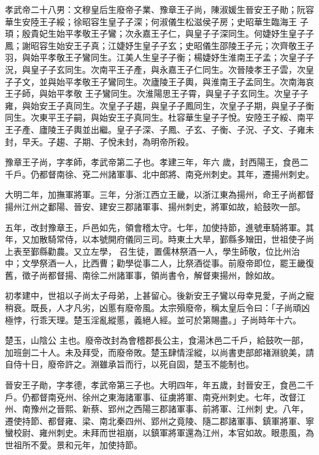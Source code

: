 
\begin{pinyinscope}

 孝武帝二十八男：文穆皇后生廢帝子業、豫章王子尚，陳淑媛生晉安王子勛；阮容華生安陸王子綏；徐昭容生皇子子深；何淑儀生松滋侯子房；史昭華生臨海王
 子頊；殷貴妃生始平孝敬王子鸞；次永嘉王子仁，與皇子子深同生。何婕妤生皇子子鳳；謝昭容生始安王子真；江婕妤生皇子子玄；史昭儀生邵陵王子元；次齊敬王子羽，與始平孝敬王子鸞同生。江美人生皇子子衡；楊婕妤生淮南王子孟；次皇子子況，與皇子子玄同生。次南平王子產，與永嘉王子仁同生。次晉陵孝王子雲，次皇子子文，並與始平孝敬王子鸞同生。次廬陵王子輿，與淮南王子孟同生。次南海哀王子師，與始平孝敬
 王子鸞同生。次淮陽思王子霄，與皇子子玄同生。次皇子子雍，與始安王子真同生。次皇子子趨，與皇子子鳳同生，次皇子子期，與皇子子衡同生。次東平王子嗣，與始安王子真同生。杜容華生皇子子悅。安陸王子綏、南平王子產、廬陵王子輿並出繼。皇子子深、子鳳、子玄、子衡、子況、子文、子雍未封，早夭。子趨、子期、子悅未封，為明帝所殺。



 豫章王子尚，字孝師，孝武帝第二子也。孝建三年，年六
 歲，封西陽王，食邑二千戶。仍都督南徐、兗二州諸軍事、北中郎將、南兗州刺史。其年，遷揚州刺史。



 大明二年，加撫軍將軍。三年，分浙江西立王畿，以浙江東為揚州，命王子尚都督揚州江州之鄱陽、晉安、建安三郡諸軍事、揚州刺史，將軍如故，給鼓吹一部。



 五年，改封豫章王，戶邑如先，領會稽太守。七年，加使持節，進號車騎將軍。其年，又加散騎常侍，以本號開府儀同三司。時東土大旱，鄞縣多矰田，世祖使子尚上表至鄞縣勸農。又立左學，
 召生徒，置儒林祭酒一人，學生師敬，位比州治中；文學祭酒一人，比西曹；勸學從事二人，比祭酒從事。前廢帝即位，罷王畿復舊，徵子尚都督揚、南徐二州諸軍事，領尚書令，解督東揚州，餘如故。



 初孝建中，世祖以子尚太子母弟，上甚留心。後新安王子鸞以母幸見愛，子尚之寵稍衰。既長，人才凡劣，凶慝有廢帝風。太宗殞廢帝，稱太皇后令曰：「子尚頑凶極悖，行乖天理。楚玉淫亂縱慝，義絕人經。並可於第賜盡。」子尚時年十六。



 楚玉，山陰公
 主也。廢帝改封為會稽郡長公主，食湯沐邑二千戶，給鼓吹一部，加班劍二十人。未及拜受，而廢帝敗。楚玉肆情淫縱，以尚書吏部郎褚淵貌美，請自侍十日，廢帝許之。淵雖承旨而行，以死自固，楚玉不能制也。



 晉安王子勛，字孝德，孝武帝第三子也。大明四年，年五歲，封晉安王，食邑二千戶。仍都督南兗州、徐州之東海諸軍事、征虜將軍、南兗州刺史。七年，改督江州、南豫州之晉熙、新蔡、郢州之西陽三郡諸軍事、前將軍、江州刺
 史。八年，遷使持節、都督雍、梁、南北秦四州、郢州之竟陵、隨二郡諸軍事、鎮軍將軍、寧蠻校尉、雍州刺史。未拜而世祖崩，以鎮軍將軍還為江州，本官如故。眼患風，為世祖所不愛。景和元年，加使持節。




\end{pinyinscope}
